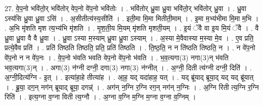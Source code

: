 \documentclass[17pt]{extarticle}
\begin{document}
27. वे॒प॒नो भवि॑तो॒र् भवि॑तोर् वेप॒नो वे॑प॒नो भवि॑तोः । . भवि॑तोर् ध्रु॒वा ध्रु॒वा भवि॑तो॒र् भवि॑तोर् ध्रु॒वा । . ध्रु॒वा ऽस्य॑सि ध्रु॒वा ध्रु॒वा ऽसि॑ । . अ॒सीतीत्य॑स्य॒सीति॑ । . इती॒मा मि॒मा मितीती॒माम् । . इ॒मा म॒भ्य॑भीमा मि॒मा म॒भि । . अ॒भि मृ॑शति मृश त्य॒भ्य॑भि मृ॑शति । . मृ॒श॒ती॒य मि॒यम् मृ॑शति मृशती॒यम् । . इ॒यं ॅवै वा इ॒य मि॒यं ॅवै । . वै ध्रु॒वा ध्रु॒वा वै वै ध्रु॒वा । . ध्रु॒वा ऽस्या म॒स्याम् ध्रु॒वा ध्रु॒वा ऽस्याम् । . अ॒स्या मे॒वैवास्या म॒स्या मे॒व । . ए॒व प्रति॒ प्रत्ये॒वैव प्रति॑ । . प्रति॑ तिष्ठति तिष्ठति॒ प्रति॒ प्रति॑ तिष्ठति । . ति॒ष्ठ॒ति॒ न न ति॑ष्ठति तिष्ठति॒ न । . न वे॑प॒नो वे॑प॒नो न न वे॑प॒नः । . वे॒प॒नो भ॑वति भवति वेप॒नो वे॑प॒नो भ॑वति । . भ॒व॒त्यगा(3) नगा(3)न् भ॑वति भव॒त्यगा(3)न् । . अगा(3) न॑ग्नी दग्नी॒ दगा(3) नगा(3) न॑ग्नीत् । . अ॒ग्नी॒ दिती त्य॑ग्नी दग्नी॒ दिति॑ । . अ॒ग्नी॒दित्य॑ग्नि - इ॒त् । . इत्या॑हा॒हे तीत्या॑ह । . आ॒ह॒ यद् यदा॑हाह॒ यत् । . यद् ब्रू॑याद् ब्रूया॒द् यद् यद् ब्रू॑यात् । . ब्रू॒या॒ दग॒न् नग॑न् ब्रूयाद् ब्रूया॒ दगन्न्॑ । . अग॑न् न॒ग्नि र॒ग्नि रग॒न् नग॑न् न॒ग्निः । . अ॒ग्नि रिती त्य॒ग्नि र॒ग्नि रिति॑ । . इत्य॒ग्ना व॒ग्ना विती त्य॒ग्नौ । . अ॒ग्ना व॒ग्नि म॒ग्नि म॒ग्ना व॒ग्ना व॒ग्निम् । \newline
\end{document}
